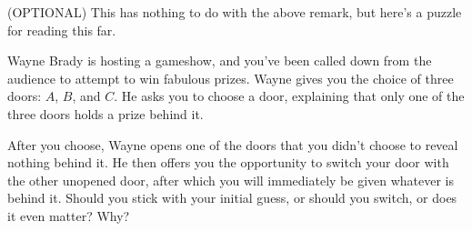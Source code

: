 \documentclass[letterpaper, twoside, 12pt]{book}
\begin{document}
\begin{problem}
  (OPTIONAL)
  This has nothing to do with the above remark, but here's a puzzle for
  reading this far.

  Wayne Brady is hosting a gameshow, and you've
  been called down from the audience to attempt to win fabulous prizes.
  Wayne gives you the choice of three doors: $A$, $B$, and $C$. He asks
  you to choose a door, explaining that only one of the three doors holds
  a prize behind it.

  After you choose, Wayne opens one of the doors that you didn't choose to
  reveal nothing behind it. He then offers you the opportunity to switch
  your door with the other unopened door, after which you will immediately
  be given whatever is behind it. Should you stick with your initial
  guess, or should you switch, or does it even matter? Why?
\end{problem}

          \begin{solution}

          \end{solution}

          \begin{contributors}

          \end{contributors}
\end{document}
